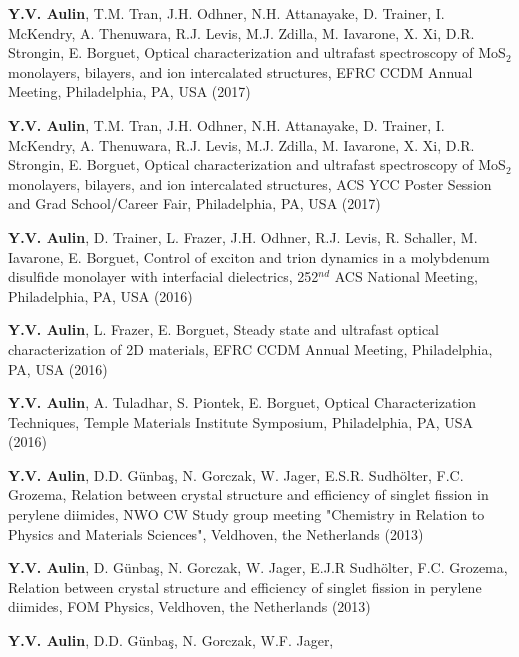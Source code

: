 \documentclass[11pt,letterpaper,sans]{moderncv} %
\begin{document}
\begin{etaremune}
	\item \textbf{Y.V. Aulin}, T.M. Tran, J.H. Odhner, N.H. Attanayake, D. Trainer,
	      I. McKendry, A. Thenuwara, R.J. Levis, M.J. Zdilla, M. Iavarone, 
	      X. Xi, D.R. Strongin, E. Borguet,
	      Optical characterization and ultrafast spectroscopy of MoS$_2$ monolayers,
	      bilayers, and ion intercalated structures, EFRC CCDM Annual Meeting,
	      Philadelphia, PA, USA (2017)
	\item \textbf{Y.V. Aulin}, T.M. Tran, J.H. Odhner, N.H. Attanayake, D. Trainer,
	      I. McKendry, A. Thenuwara, R.J. Levis, M.J. Zdilla, M. Iavarone, 
	      X. Xi, D.R. Strongin, E. Borguet,
	      Optical characterization and ultrafast spectroscopy of MoS$_2$ monolayers,
	      bilayers, and ion intercalated structures,
	      ACS YCC Poster Session and Grad School/Career Fair, Philadelphia, PA, USA (2017)
	\item \textbf{Y.V. Aulin}, D. Trainer, L. Frazer, J.H. Odhner, R.J. Levis, R. Schaller,
	      M. Iavarone, E. Borguet, 
	      Control of exciton and trion dynamics in a molybdenum disulfide monolayer
	      with interfacial dielectrics, 252$^{nd}$ ACS National Meeting, 
	      Philadelphia, PA, USA (2016)
        \item \textbf{Y.V. Aulin}, L. Frazer, E. Borguet, 
              Steady state and ultrafast optical characterization of 2D
              materials, EFRC CCDM Annual Meeting, Philadelphia, PA, USA (2016)
        \item \textbf{Y.V. Aulin}, A. Tuladhar, S. Piontek, E. Borguet, 
              Optical Characterization Techniques, Temple Materials Institute Symposium,
              Philadelphia, PA, USA (2016)
        \item \textbf{Y.V. Aulin}, D.D. Günbaş, N. Gorczak, W. Jager, E.S.R. Sudhölter, F.C. Grozema,
              Relation between crystal structure and efficiency of singlet fission
              in perylene diimides, NWO CW Study group meeting 
              "Chemistry in Relation to Physics and Materials Sciences",
               Veldhoven, the Netherlands (2013)
        \item \textbf{Y.V. Aulin}, D. Günbaş, N. Gorczak, W. Jager, 
              E.J.R Sudhölter, F.C. Grozema,
              Relation between crystal structure and 
              efficiency of singlet fission in perylene diimides,
              FOM Physics, Veldhoven, the Netherlands (2013)
        \item \textbf{Y.V. Aulin}, D.D. Günbaş, N. Gorczak, W.F. Jager, 

\end{etaremune}
\end{document}
